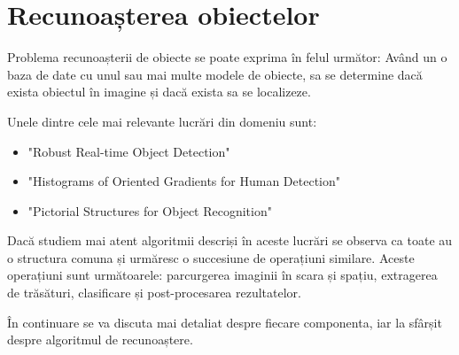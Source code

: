 \chapter{Recunoașterea obiectelor}




Problema recunoașterii de obiecte se poate exprima în felul următor: Având un o baza de date cu unul sau mai multe modele de obiecte, sa se determine dacă exista obiectul în imagine și dacă exista sa se localizeze.

Unele dintre cele mai relevante lucrări din domeniu sunt: 
\begin{itemize}
	\item "Robust Real-time Object Detection" \cite{Viola01robustreal-time}
	\item "Histograms of Oriented Gradients for Human Detection" \cite{Dalal05histogramsof}
	\item "Pictorial Structures for Object Recognition" \cite{Felzenszwalb03pictorialstructures}
\end{itemize}

Dacă studiem mai atent algoritmii descriși în aceste lucrări se observa ca toate au o structura comuna și urmăresc o succesiune de operațiuni similare.
Aceste operațiuni sunt următoarele: parcurgerea imaginii în scara și spațiu, extragerea de trăsături, clasificare și post-procesarea rezultatelor.

În continuare se va discuta mai detaliat despre fiecare componenta, iar la sfârșit despre algoritmul de recunoaștere.